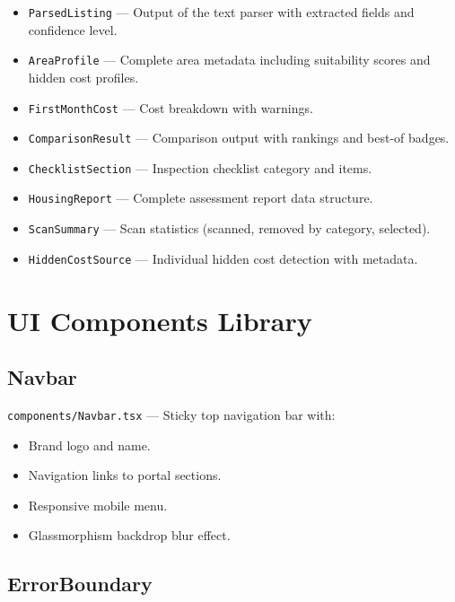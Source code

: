 \documentclass[12pt, a4paper, oneside]{report}
\newcommand{\filepath}[1]{\texttt{\small\color{codeblue}#1}}
\newcommand{\typename}[1]{\texttt{\small\color{codeblue}#1}}
\begin{document}
\begin{itemize}[leftmargin=2em]
  \item \typename{ParsedListing} --- Output of the text parser with extracted fields and confidence level.
  \item \typename{AreaProfile} --- Complete area metadata including suitability scores and hidden cost profiles.
  \item \typename{FirstMonthCost} --- Cost breakdown with warnings.
  \item \typename{ComparisonResult} --- Comparison output with rankings and best-of badges.
  \item \typename{ChecklistSection} --- Inspection checklist category and items.
  \item \typename{HousingReport} --- Complete assessment report data structure.
  \item \typename{ScanSummary} --- Scan statistics (scanned, removed by category, selected).
  \item \typename{HiddenCostSource} --- Individual hidden cost detection with metadata.
\end{itemize}


\chapter{UI Components Library}

\section{Navbar}

\filepath{components/Navbar.tsx} --- Sticky top navigation bar with:
\begin{itemize}[leftmargin=2em]
  \item Brand logo and name.
  \item Navigation links to portal sections.
  \item Responsive mobile menu.
  \item Glassmorphism backdrop blur effect.
\end{itemize}

\section{ErrorBoundary}
\end{document}
